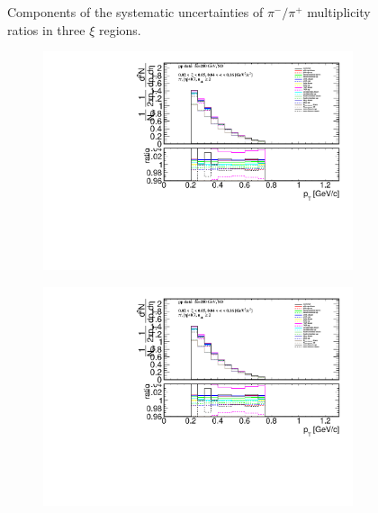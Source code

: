 \begin{figure}[h!]
\begin{subfigure}{.49\textwidth}
	\end{subfigure}
	\begin{minipage}{.49\textwidth}
		\caption{Components of the systematic uncertainties of $\pi^-/\pi^+$ multiplicity ratios  in three $\xi$ regions. }
		\label{fig:results_star_syst_pi}
	\end{minipage}
	\vspace{-2.5cm}
\end{figure}


\begin{figure}[h!]
	\vspace{-2.5cm}
	\centering
		\begin{subfigure}{.49\textwidth}
			\includegraphics[width=\textwidth,page=22]{chapters/chrgSTAR/img/syst/outPID_SDT.pdf}
		\end{subfigure}
		\begin{subfigure}{.49\textwidth}
			\includegraphics[width=\textwidth,page=23]{chapters/chrgSTAR/img/syst/outPID_SDT.pdf}

\end{subfigure}
\end{figure}
